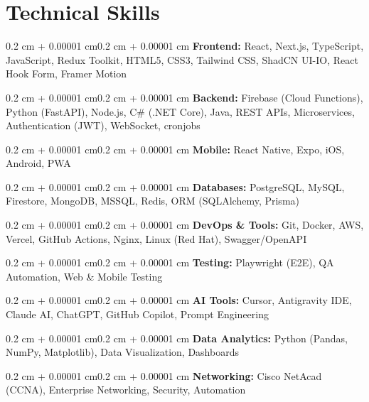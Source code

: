 \documentclass[10pt, letterpaper]{article}
\newenvironment{onecolentry}{\begin{adjustwidth}{0.2 cm + 0.00001 cm}{0.2 cm + 0.00001 cm}}{\end{adjustwidth}}
\begin{document}
\section{Technical Skills}
\begin{onecolentry}
\textbf{Frontend:} React, Next.js, TypeScript, JavaScript, Redux Toolkit, HTML5, CSS3, Tailwind CSS, ShadCN UI-IO, React Hook Form, Framer Motion
\end{onecolentry}
\vspace{0.2 cm}
\begin{onecolentry}
\textbf{Backend:} Firebase (Cloud Functions), Python (FastAPI), Node.js, C\# (.NET Core), Java, REST APIs, Microservices, Authentication (JWT), WebSocket, cronjobs
\end{onecolentry}
\vspace{0.2 cm}
\begin{onecolentry}
\textbf{Mobile:} React Native, Expo, iOS, Android, PWA
\end{onecolentry}
\vspace{0.2 cm}
\begin{onecolentry}
\textbf{Databases:} PostgreSQL, MySQL, Firestore, MongoDB, MSSQL, Redis, ORM (SQLAlchemy, Prisma)
\end{onecolentry}
\vspace{0.2 cm}
\begin{onecolentry}
\textbf{DevOps \& Tools:} Git, Docker, AWS, Vercel, GitHub Actions, Nginx, Linux (Red Hat), Swagger/OpenAPI
\end{onecolentry}
\vspace{0.2 cm}
\begin{onecolentry}
\textbf{Testing:} Playwright (E2E), QA Automation, Web \& Mobile Testing
\end{onecolentry}
\vspace{0.2 cm}
\begin{onecolentry}
\textbf{AI Tools:} Cursor, Antigravity IDE, Claude AI, ChatGPT, GitHub Copilot, Prompt Engineering
\end{onecolentry}
\vspace{0.2 cm}
\begin{onecolentry}
\textbf{Data Analytics:} Python (Pandas, NumPy, Matplotlib), Data Visualization, Dashboards
\end{onecolentry}
\vspace{0.2 cm}
\begin{onecolentry}
\textbf{Networking:} Cisco NetAcad (CCNA), Enterprise Networking, Security, Automation
\end{onecolentry}
\end{document}
